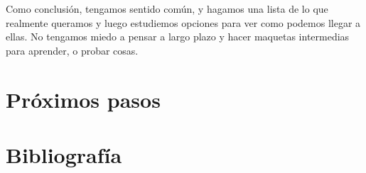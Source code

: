 Como conclusión, tengamos sentido común, y hagamos una lista de lo que realmente queramos y luego
estudiemos opciones para ver como podemos llegar a ellas. No tengamos miedo a pensar a largo plazo y
hacer maquetas intermedias para aprender, o probar cosas. 
\section{Próximos pasos}

\section{Bibliografía}
\printbibliography[heading=subbibliography]
